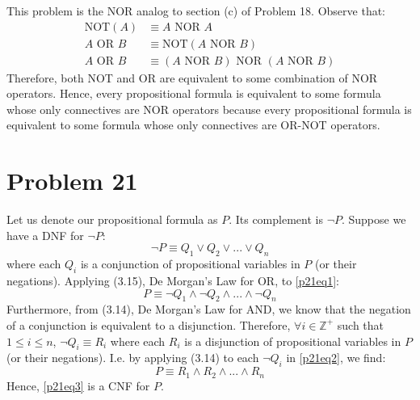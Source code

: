 \documentclass{article}
\begin{document}
This problem is the NOR analog to section (c) of Problem 18. Observe that:
\begin{align*}
	\text{NOT}(A)   & \equiv A \text{ NOR } A                                   \\
	A \text{ OR } B & \equiv \text{NOT}(A \text{ NOR } B)                       \\
	A \text{ OR } B & \equiv (A \text{ NOR } B) \text{ NOR } (A \text{ NOR } B)
\end{align*}
Therefore, both NOT and OR are equivalent to some combination of NOR operators. Hence, every propositional formula is equivalent to some formula whose only connectives are NOR operators because every propositional formula is equivalent to some formula whose only connectives are OR-NOT operators.

\pagebreak

\section{Problem 21}
Let us denote our propositional formula as $P$. Its complement is $\neg P$. Suppose we have a DNF for $\neg P$:
\begin{equation}\label{p21eq1}
	\neg P \equiv Q_1 \lor Q_2 \lor ... \lor Q_n
\end{equation}
where each $Q_i$ is a conjunction of propositional variables in $P$ (or their negations). Applying (3.15), De Morgan's Law for OR, to \eqref{p21eq1}:
\begin{equation}\label{p21eq2}
	P \equiv \neg Q_1 \land \neg Q_2 \land ... \land \neg Q_n
\end{equation}
Furthermore, from (3.14), De Morgan's Law for AND, we know that the negation of a conjunction is equivalent to a disjunction. Therefore, $\forall i \in \mathbb{Z^+}$ such that $1 \le i \le n$, $\neg Q_i \equiv R_i$ where each $R_i$ is a disjunction of propositional variables in $P$ (or their negations). I.e. by applying (3.14) to each $\neg Q_i$ in \eqref{p21eq2}, we find:
\begin{equation}\label{p21eq3}
	P \equiv R_1 \land R_2 \land ... \land R_n
\end{equation}
Hence, \eqref{p21eq3} is a CNF for $P$.

\pagebreak
\end{document}
